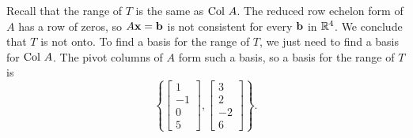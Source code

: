 \begin{example}
\item Recall that the range of $T$ is the same as $\text{Col } A$. The reduced row echelon form of $A$ has a row of zeros, so $A \mathbf{x} = \mathbf{b}$ is not consistent for every $\mathbf{b}$ in $\mathbb{R}^4$. We conclude that $T$ is not onto. To find a basis for the range of $T$, we just need to find a basis for $\text{Col } A$. The pivot columns of $A$ form such a basis, so a basis for the range of $T$ is 
\[\left\{ \left[ \begin{array}{r} 1\\-1 \\ 0\\5 \end{array} \right], \left[ \begin{array}{r} 3\\2 \\ -2\\6 \end{array} \right] \right\}.\]

\ea

\end{example}

\label{sec:null_summ}


